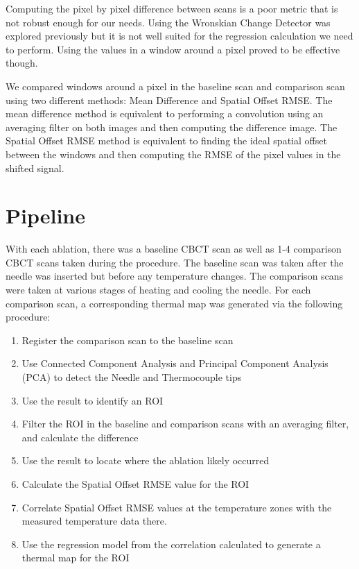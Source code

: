 \documentclass[]{spie}  %
\begin{document}
Computing the pixel by pixel difference between scans is a poor metric that is not robust enough for our needs. Using the Wronskian Change Detector was explored previously \cite{Li13} but it is not well suited for the regression calculation we need to perform. Using the values in a window around a pixel proved to be effective though. 

We compared windows around a pixel in the baseline scan and comparison scan using two different methods: Mean Difference and Spatial Offset RMSE. The mean difference method is equivalent to performing a convolution using an averaging filter on both images and then computing the difference image. The Spatial Offset RMSE method is equivalent to finding the ideal spatial offset between the windows and then computing the RMSE of the pixel values in the shifted signal. 


\section{Pipeline}

With each ablation, there was a baseline CBCT scan as well as 1-4 comparison CBCT scans taken during the procedure. The baseline scan was taken after the needle was inserted but before any temperature changes. The comparison scans were taken at various stages of heating and cooling the needle. For each comparison scan, a corresponding thermal map was generated via the following procedure:
\begin{enumerate}
\item Register the comparison scan to the baseline scan
\item Use Connected Component Analysis and Principal Component Analysis (PCA) to detect the Needle and Thermocouple tips
\item Use the result to identify an ROI
\item Filter the ROI in the baseline and comparison scans with an averaging filter, and calculate the difference
\item Use the result to locate where the ablation likely occurred
\item Calculate the Spatial Offset RMSE value for the ROI
\item Correlate Spatial Offset RMSE values at the temperature zones with the measured temperature data there. 
\item Use the regression model from the correlation calculated to generate a thermal map for the ROI
\end{enumerate}
\end{document}
